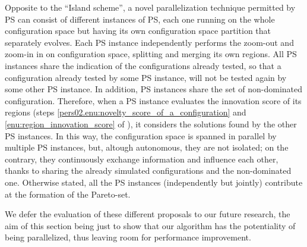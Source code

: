 Opposite to the ``Island  scheme'', a novel parallelization technique permitted by PS can consist of different instances of PS, each one running on the whole configuration space but having its own configuration space partition that separately evolves. Each PS instance independently performs the zoom-out and zoom-in in on configuration space, splitting and merging its own regions. All PS instances share the indication of the configurations already tested, so that a configuration already tested by some PS instance, will not be tested again by some other PS instance. In addition, PS instances share the set of non-dominated configuration. Therefore, when a PS instance evaluates the innovation score of its regions (steps \ref{pers02.enu:novelty_score_of_a_configuration} and \ref{enu:region_innovation_score} of ), it considers the solutions found by the other PS instances. In this way, the configuration space is spanned in parallel by multiple PS instances, but, altough autonomous, they are not isolated; on the contrary, they continuously exchange information and influence each other, thanks to sharing the already simulated configurations and the non-dominated one. Otherwise stated, all the PS instances (independently but jointly) contribute at the formation of the Pareto-set.

We defer the evaluation of these different proposals to our future research, the aim of this section being just to show that our algorithm has the potentiality of being parallelized, thus leaving room for performance improvement.
